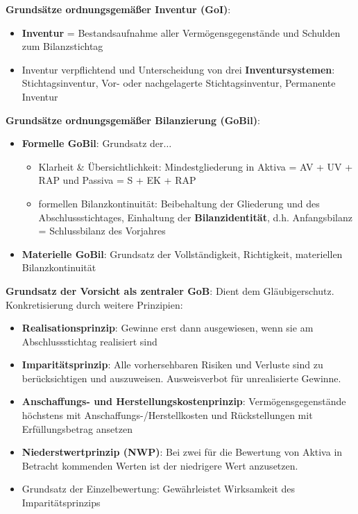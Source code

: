 \textbf{Grundsätze ordnungsgemäßer Inventur (GoI)}:
\begin{itemize}
	\item \textbf{Inventur} = Bestandsaufnahme aller Vermögensgegenstände und Schulden zum Bilanzstichtag
	\item Inventur verpflichtend und Unterscheidung von drei \textbf{Inventursystemen}:
	Stichtagsinventur, Vor- oder nachgelagerte Stichtagsinventur, Permanente Inventur
\end{itemize}

\textbf{Grundsätze ordnungsgemäßer Bilanzierung (GoBil)}:
\begin{itemize}
	\item \textbf{Formelle GoBil}: Grundsatz der$\ldots$
	\begin{itemize}
		\item Klarheit \& Übersichtlichkeit: Mindestgliederung in Aktiva = AV + UV + RAP und Passiva = S + EK + RAP
		\item formellen Bilanzkontinuität: Beibehaltung der Gliederung und des Abschlussstichtages, Einhaltung der \textbf{Bilanzidentität}, d.h. Anfangsbilanz = Schlussbilanz des Vorjahres
	\end{itemize}
	\item \textbf{Materielle GoBil}: Grundsatz der Vollständigkeit, Richtigkeit, materiellen Bilanzkontinuität
\end{itemize}

\textbf{Grundsatz der Vorsicht als zentraler GoB}: Dient dem Gläubigerschutz. Konkretisierung durch weitere Prinzipien:
\begin{itemize}
	\item \textbf{Realisationsprinzip}: Gewinne erst dann ausgewiesen, wenn sie am Abschlussstichtag realisiert sind
	\item \textbf{Imparitätsprinzip}: Alle vorhersehbaren Risiken und Verluste sind zu berücksichtigen und auszuweisen. Ausweisverbot für unrealisierte Gewinne.
	\item \textbf{Anschaffungs- und Herstellungskostenprinzip}: Vermögensgegenstände höchstens mit  Anschaffungs-/Herstellkosten und Rückstellungen mit Erfüllungsbetrag ansetzen
	\item \textbf{Niederstwertprinzip (NWP)}: Bei zwei für die Bewertung von Aktiva in Betracht kommenden Werten ist der niedrigere Wert anzusetzen.
	\item Grundsatz der Einzelbewertung: Gewährleistet Wirksamkeit des Imparitätsprinzips
\end{itemize}


